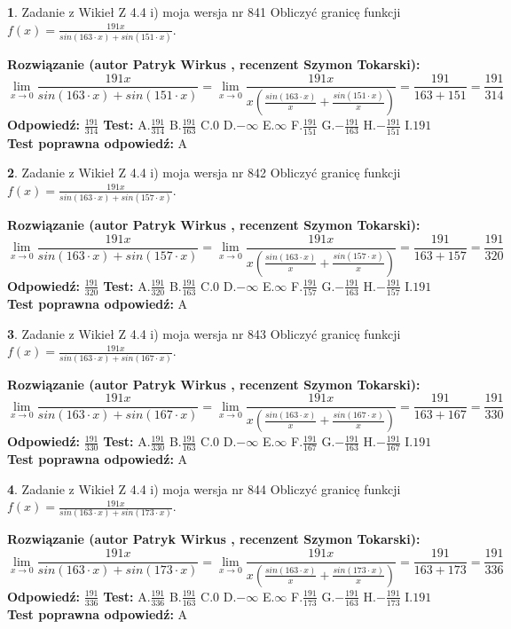 \documentclass[12pt, a4paper]{article}
\theoremstyle{definition} %
\newtheorem{zad}{}
\newcommand{\zadStart}[1]{\begin{zad}#1\newline}
\newcommand{\zadStop}{\end{zad}}
\newcommand{\rozwStart}[2]{\noindent \textbf{Rozwiązanie (autor #1 , recenzent #2): }\newline}
\newcommand{\rozwStop}{\newline}
\newcommand{\odpStart}{\noindent \textbf{Odpowiedź:}\newline}
\newcommand{\odpStop}{\newline}
\newcommand{\testStart}{\noindent \textbf{Test:}\newline}
\newcommand{\testStop}{\newline}
\newcommand{\kluczStart}{\noindent \textbf{Test poprawna odpowiedź:}\newline}
\newcommand{\kluczStop}{\newline}
\begin{document}
\zadStart{Zadanie z Wikieł Z 4.4 i) moja wersja nr 841}
Obliczyć granicę funkcji $f(x)=\frac{191x}{sin(163\cdot x) +sin(151\cdot x)}$.
\zadStop
\rozwStart{Patryk Wirkus}{Szymon Tokarski}
$$\lim\limits_{x\to 0}\frac{191x}{sin(163\cdot x) +sin(151\cdot x)}=\lim\limits_{x\to 0}\frac{191x}{x(\frac{sin(163\cdot x)}{x}+\frac{sin(151\cdot x)}{x})}=\frac{191}{163+151} = \frac{191}{314}$$
\rozwStop
\odpStart
$\frac{191}{314}$
\odpStop
\testStart
A.$\frac{191}{314}$
B.$\frac{191}{163}$
C.$0$
D.$-\infty$
E.$\infty$
F.$\frac{191}{151}$
G.$-\frac{191}{163}$
H.$-\frac{191}{151}$
I.$191$
\testStop
\kluczStart
A
\kluczStop



\zadStart{Zadanie z Wikieł Z 4.4 i) moja wersja nr 842}
Obliczyć granicę funkcji $f(x)=\frac{191x}{sin(163\cdot x) +sin(157\cdot x)}$.
\zadStop
\rozwStart{Patryk Wirkus}{Szymon Tokarski}
$$\lim\limits_{x\to 0}\frac{191x}{sin(163\cdot x) +sin(157\cdot x)}=\lim\limits_{x\to 0}\frac{191x}{x(\frac{sin(163\cdot x)}{x}+\frac{sin(157\cdot x)}{x})}=\frac{191}{163+157} = \frac{191}{320}$$
\rozwStop
\odpStart
$\frac{191}{320}$
\odpStop
\testStart
A.$\frac{191}{320}$
B.$\frac{191}{163}$
C.$0$
D.$-\infty$
E.$\infty$
F.$\frac{191}{157}$
G.$-\frac{191}{163}$
H.$-\frac{191}{157}$
I.$191$
\testStop
\kluczStart
A
\kluczStop



\zadStart{Zadanie z Wikieł Z 4.4 i) moja wersja nr 843}
Obliczyć granicę funkcji $f(x)=\frac{191x}{sin(163\cdot x) +sin(167\cdot x)}$.
\zadStop
\rozwStart{Patryk Wirkus}{Szymon Tokarski}
$$\lim\limits_{x\to 0}\frac{191x}{sin(163\cdot x) +sin(167\cdot x)}=\lim\limits_{x\to 0}\frac{191x}{x(\frac{sin(163\cdot x)}{x}+\frac{sin(167\cdot x)}{x})}=\frac{191}{163+167} = \frac{191}{330}$$
\rozwStop
\odpStart
$\frac{191}{330}$
\odpStop
\testStart
A.$\frac{191}{330}$
B.$\frac{191}{163}$
C.$0$
D.$-\infty$
E.$\infty$
F.$\frac{191}{167}$
G.$-\frac{191}{163}$
H.$-\frac{191}{167}$
I.$191$
\testStop
\kluczStart
A
\kluczStop



\zadStart{Zadanie z Wikieł Z 4.4 i) moja wersja nr 844}
Obliczyć granicę funkcji $f(x)=\frac{191x}{sin(163\cdot x) +sin(173\cdot x)}$.
\zadStop
\rozwStart{Patryk Wirkus}{Szymon Tokarski}
$$\lim\limits_{x\to 0}\frac{191x}{sin(163\cdot x) +sin(173\cdot x)}=\lim\limits_{x\to 0}\frac{191x}{x(\frac{sin(163\cdot x)}{x}+\frac{sin(173\cdot x)}{x})}=\frac{191}{163+173} = \frac{191}{336}$$
\rozwStop
\odpStart
$\frac{191}{336}$
\odpStop
\testStart
A.$\frac{191}{336}$
B.$\frac{191}{163}$
C.$0$
D.$-\infty$
E.$\infty$
F.$\frac{191}{173}$
G.$-\frac{191}{163}$
H.$-\frac{191}{173}$
I.$191$
\testStop
\kluczStart
A
\kluczStop
\end{document}
